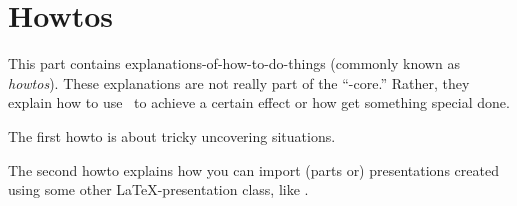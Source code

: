 \documentclass{ltxdoc}
\begin{document}
\part{Howtos}

This part contains explanations-of-how-to-do-things (commonly known as
\emph{howtos}). These explanations are not really part of the
``\beamer-core.'' Rather, they explain how to use \beamer\ to achieve
a certain effect or how get something special done.

The first howto is about tricky uncovering situations.

The second howto explains how you can import (parts or) presentations
created using some other \LaTeX-presentation class, like \prosper. 





\printindex
\end{document}
